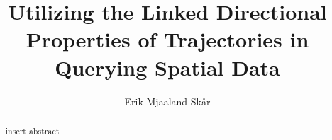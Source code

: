 \documentclass[12pt]{report}
\author{Erik Mjaaland Skår}
\title{Utilizing the Linked Directional Properties of Trajectories in Querying Spatial Data}
\begin{document}
\maketitle
\newpage
\begin{abstract}
	insert abstract
\end{abstract}
\newpage
\tableofcontents
\listoffigures
\listoftables
\cleardoublepage
{}

\newpage

\newpage


\newpage

\end{document}
